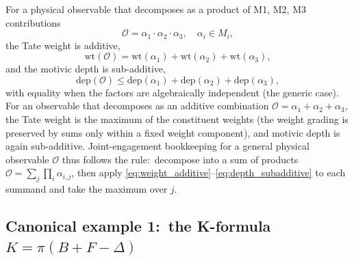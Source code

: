 \documentclass[11pt,a4paper]{article}
\theoremstyle{plain}
\theoremstyle{definition}
\begin{document}
For a physical observable that decomposes as a product of M1, M2, M3
contributions
\begin{equation}
\label{eq:obs_factorise}
\mathcal{O} = \alpha_1 \cdot \alpha_2 \cdot \alpha_3, \quad
\alpha_i \in M_i,
\end{equation}
the Tate weight is additive,
\begin{equation}
\label{eq:weight_additive}
\mathrm{wt}(\mathcal{O}) = \mathrm{wt}(\alpha_1) + \mathrm{wt}(\alpha_2) + \mathrm{wt}(\alpha_3),
\end{equation}
and the motivic depth is sub-additive,
\begin{equation}
\label{eq:depth_subadditive}
\mathrm{dep}(\mathcal{O}) \le \mathrm{dep}(\alpha_1) + \mathrm{dep}(\alpha_2) + \mathrm{dep}(\alpha_3),
\end{equation}
with equality when the factors are algebraically independent (the
generic case).  For an observable that decomposes as an additive
combination
$\mathcal{O} = \alpha_1 + \alpha_2 + \alpha_3$,
the Tate weight is the maximum of the constituent weights (the
weight grading is preserved by sums only within a fixed weight
component), and motivic depth is again sub-additive.  Joint-engagement
bookkeeping for a general physical observable $\mathcal{O}$ thus
follows the rule:\ decompose into a sum of products
$\mathcal{O} = \sum_j \prod_i \alpha_{i,j}$, then apply
\eqref{eq:weight_additive}--\eqref{eq:depth_subadditive} to each
summand and take the maximum over $j$.

\subsection{Canonical example 1:\ the K-formula
$K = \pi(B + F - \Delta)$}
\end{document}
